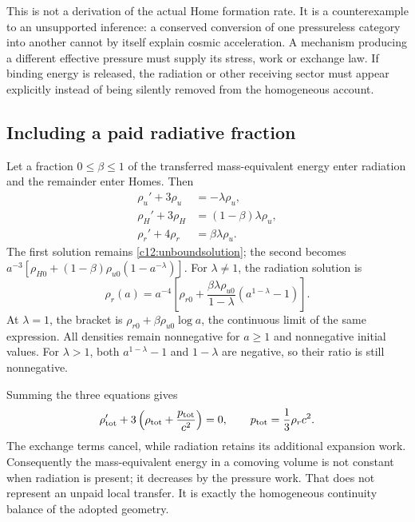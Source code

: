 This is not a derivation of the actual Home formation rate. It is a counterexample to an unsupported inference: a conserved conversion of one pressureless category into another cannot by itself explain cosmic acceleration. A mechanism producing a different effective pressure must supply its stress, work or exchange law. If binding energy is released, the radiation or other receiving sector must appear explicitly instead of being silently removed from the homogeneous account.

\subsection{Including a paid radiative fraction}
Let a fraction $0\leq\beta\leq1$ of the transferred mass-equivalent energy enter radiation and the remainder enter Homes. Then
\begin{align}
 \rho_u'+3\rho_u&=-\lambda\rho_u,\label{c12:transferu}\\
 \rho_H'+3\rho_H&=(1-\beta)\lambda\rho_u,\label{c12:transferhome}\\
 \rho_r'+4\rho_r&=\beta\lambda\rho_u.
 \label{c12:transferradiation}
\end{align}
The first solution remains \eqref{c12:unboundsolution}; the second becomes $a^{-3}[\rho_{H0}+(1-\beta)\rho_{u0}(1-a^{-\lambda})]$. For $\lambda\ne1$, the radiation solution is
\begin{equation}
 \rho_r(a)=a^{-4}\left[
 \rho_{r0}+\frac{\beta\lambda\rho_{u0}}{1-\lambda}
                 (a^{1-\lambda}-1)\right].
 \label{c12:radiationsolution}
\end{equation}
At $\lambda=1$, the bracket is $\rho_{r0}+\beta\rho_{u0}\log a$, the continuous limit of the same expression. All densities remain nonnegative for $a\geq1$ and nonnegative initial values. For $\lambda>1$, both $a^{1-\lambda}-1$ and $1-\lambda$ are negative, so their ratio is still nonnegative.

Summing the three equations gives
\begin{equation}
 \rho_{\rm tot}'+3\left(\rho_{\rm tot}+\frac{p_{\rm tot}}{c^2}\right)=0,
 \qquad p_{\rm tot}=\frac13\rho_rc^2.
 \label{c12:totalcontinuity}
\end{equation}
The exchange terms cancel, while radiation retains its additional expansion work. Consequently the mass-equivalent energy in a comoving volume is not constant when radiation is present; it decreases by the pressure work. That does not represent an unpaid local transfer. It is exactly the homogeneous continuity balance of the adopted geometry.

